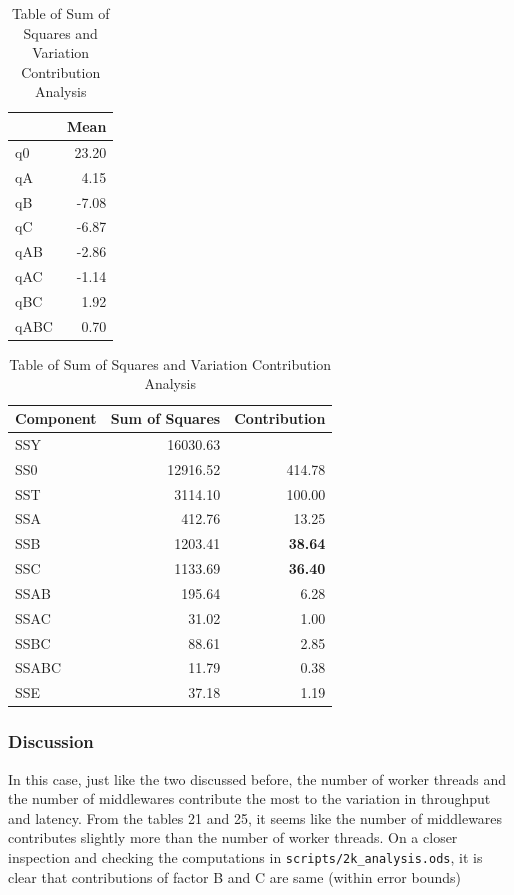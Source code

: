 \documentclass[11pt,a4paper]{article}
\begin{document}
\begin{table}[H]
	\begin{minipage}{.5\linewidth}
	\caption{Table of q values}
	\centering
	\begin{tabular}{|l|r|}
		\hline
		& \multicolumn{1}{l|}{Mean} \\ \hline
		q0 & 23.20 \\ \hline
		qA & 4.15 \\ \hline
		qB & -7.08 \\ \hline
		qC & -6.87 \\ \hline
		qAB & -2.86 \\ \hline
		qAC & -1.14 \\ \hline
		qBC & 1.92 \\ \hline
		qABC & 0.70 \\ \hline
	\end{tabular}		
	\end{minipage}%
	\begin{minipage}{.5\linewidth}
	\caption{Table of Sum of Squares and Variation Contribution Analysis}
	\centering
	\begin{tabular}{|l|r|r|}
		\hline
		Component & \multicolumn{1}{l|}{Sum of Squares} & \multicolumn{1}{l|}{Contribution} \\ \hline
		SSY & 16030.63 & \multicolumn{1}{l|}{} \\ \hline
		SS0 & 12916.52 & 414.78 \\ \hline
		SST & 3114.10 & 100.00 \\ \hline
		SSA & 412.76 & 13.25 \\ \hline
		SSB & 1203.41 & \textbf{38.64} \\ \hline
		SSC & 1133.69 & \textbf{36.40} \\ \hline
		SSAB & 195.64 & 6.28 \\ \hline
		SSAC & 31.02 & 1.00 \\ \hline
		SSBC & 88.61 & 2.85 \\ \hline
		SSABC & 11.79 & 0.38 \\ \hline
		SSE & 37.18 & 1.19 \\ \hline
	\end{tabular}		
	\end{minipage} 
\end{table}

\subsubsection{Discussion}
In this case, just like the two discussed before, the number of worker threads and the number of middlewares contribute the most to the variation in throughput and latency. From the tables 21 and 25, it seems like the number of middlewares contributes slightly more than the number of worker threads. On a closer inspection and checking the computations in \texttt{scripts/2k\_analysis.ods}, it is clear that contributions of factor B and C are same (within error bounds)
\end{document}
